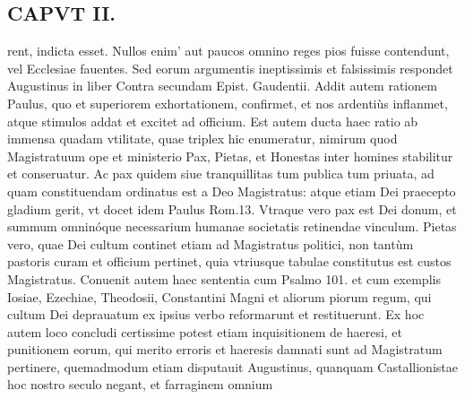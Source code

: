 \documentclass{article}
\begin{document}
\begin{pages}
\section*{CAPVT II. }
\marginpar{[ p.49 ]}\pstart rent, indicta esset. Nullos enim' aut paucos omnino reges pios fuisse contendunt, vel Ecclesiae fauentes. Sed eorum argumentis ineptissimis et falsissimis respondet Augustinus in liber  Contra secundam Epist. Gaudentii.  \pend\pstart Addit autem rationem Paulus, quo et superiorem exhortationem, confirmet, et nos ardentiùs inflanmet, atque  stimulos addat et excitet ad officium. Est autem ducta haec ratio ab immensa quadam vtilitate, quae triplex hic enumeratur, nimirum quod Magistratuum ope et ministerio Pax, Pietas, et Honestas inter homines stabilitur et conseruatur.  \pend\pstart Ac pax quidem siue tranquillitas tum publica tum priuata, ad quam constituendam ordinatus est a Deo Magistratus: atque etiam Dei praecepto gladium gerit, vt docet idem Paulus Rom.13. Vtraque vero pax est Dei donum, et summum omninóque necessarium humanae societatis retinendae vinculum.  \pend\pstart Pietas vero, quae Dei cultum continet etiam ad Magistratus politici, non tantùm pastoris curam et officium pertinet, quia vtriusque tabulae constitutus est custos Magistratus. Conuenit autem haec sententia cum Psalmo 101. et cum exemplis Iosiae, Ezechiae, Theodosii, Constantini Magni et aliorum piorum regum, qui cultum Dei deprauatum ex ipsius verbo reformarunt et restituerunt. Ex hoc autem loco concludi certissime potest etiam inquisitionem de haeresi, et punitionem eorum, qui merito erroris et haeresis damnati sunt ad Magistratum pertinere, quemadmodum etiam disputauit Augustinus, quanquam Castallionistae hoc nostro seculo negant, et farraginem omnium\pend

\end{pages}
\end{document}
